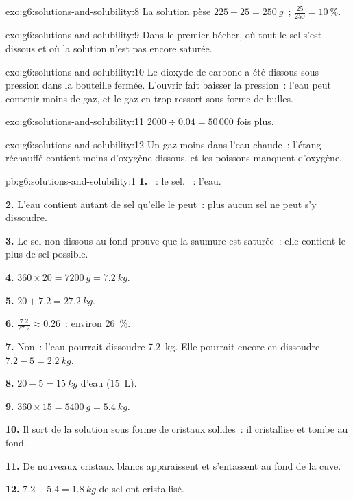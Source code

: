 \begin{solution}{exo:g6:solutions-and-solubility:8}
La solution pèse $225 + 25 = \qty{250}{g}$~; $\frac{25}{250} =
\qty{10}{\percent}$.
\end{solution}

\begin{solution}{exo:g6:solutions-and-solubility:9}
Dans le premier bécher, où tout le sel s'est dissous et où la solution
n'est pas encore saturée.
\end{solution}

\begin{solution}{exo:g6:solutions-and-solubility:10}
Le dioxyde de carbone a été dissous sous pression dans la bouteille
fermée. L'ouvrir fait baisser la pression~: l'eau peut contenir moins de
gaz, et le gaz en trop ressort sous forme de bulles.
\end{solution}

\begin{solution}{exo:g6:solutions-and-solubility:11}
$2000 \div 0.04 = 50\,000$ fois plus.
\end{solution}

\begin{solution}{exo:g6:solutions-and-solubility:12}
Un gaz  moins dans l'eau chaude~: l'étang réchauffé contient
moins d'oxygène dissous, et les poissons manquent d'oxygène.
\end{solution}

\begin{solution}{pb:g6:solutions-and-solubility:1}
\textbf{1.} ~: le sel. ~: l'eau.

\textbf{2.} L'eau contient autant de sel qu'elle le peut~: plus aucun sel
ne peut s'y dissoudre.

\textbf{3.} Le sel non dissous au fond prouve que la saumure est
saturée~: elle contient le plus de sel possible.

\textbf{4.} $360 \times 20 = \qty{7200}{g} = \qty{7.2}{kg}$.

\textbf{5.} $20 + 7.2 = \qty{27.2}{kg}$.

\textbf{6.} $\frac{7.2}{27.2} \approx 0.26$~: environ \qty{26}{\percent}.

\textbf{7.} Non~: l'eau pourrait dissoudre \qty{7.2}{kg}. Elle pourrait
encore en dissoudre $7.2 - 5 = \qty{2.2}{kg}$.

\textbf{8.} $20 - 5 = \qty{15}{kg}$ d'eau (\qty{15}{L}).

\textbf{9.} $360 \times 15 = \qty{5400}{g} = \qty{5.4}{kg}$.

\textbf{10.} Il sort de la solution sous forme de cristaux solides~: il
cristallise et tombe au fond.

\textbf{11.} De nouveaux cristaux blancs apparaissent et s'entassent au
fond de la cuve.

\textbf{12.} $7.2 - 5.4 = \qty{1.8}{kg}$ de sel ont cristallisé.
\end{solution}

